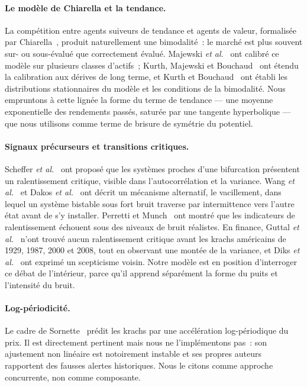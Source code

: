 \documentclass[11pt,a4paper]{article}
\begin{document}
\paragraph{Le modèle de Chiarella et la tendance.} La compétition entre agents suiveurs de tendance et agents de valeur, formalisée par Chiarella~\cite{chiarella1992}, produit naturellement une bimodalité~: le marché est plus souvent sur- ou sous-évalué que correctement évalué. Majewski \emph{et al.}~\cite{majewski2020} ont calibré ce modèle sur plusieurs classes d'actifs~; Kurth, Majewski et Bouchaud~\cite{kurth2025excess} ont étendu la calibration aux dérives de long terme, et Kurth et Bouchaud~\cite{kurth2025chiarella} ont établi les distributions stationnaires du modèle et les conditions de la bimodalité. Nous empruntons à cette lignée la forme du terme de tendance --- une moyenne exponentielle des rendements passés, saturée par une tangente hyperbolique --- que nous utilisons comme terme de brisure de symétrie du potentiel.

\paragraph{Signaux précurseurs et transitions critiques.} Scheffer \emph{et al.}~\cite{scheffer2009} ont proposé que les systèmes proches d'une bifurcation présentent un ralentissement critique, visible dans l'autocorrélation et la variance. Wang \emph{et al.}~\cite{wang2012} et Dakos \emph{et al.}~\cite{dakos2013} ont décrit un mécanisme alternatif, le vacillement, dans lequel un système bistable sous fort bruit traverse par intermittence vers l'autre état avant de s'y installer. Perretti et Munch~\cite{perretti2012} ont montré que les indicateurs de ralentissement échouent sous des niveaux de bruit réalistes. En finance, Guttal \emph{et al.}~\cite{guttal2016} n'ont trouvé aucun ralentissement critique avant les krachs américains de 1929, 1987, 2000 et 2008, tout en observant une montée de la variance, et Diks \emph{et al.}~\cite{diks2019} ont exprimé un scepticisme voisin. Notre modèle est en position d'interroger ce débat de l'intérieur, parce qu'il apprend séparément la forme du puits et l'intensité du bruit.

\paragraph{Log-périodicité.} Le cadre de Sornette~\cite{sornette2003,johansen1999} prédit les krachs par une accélération log-périodique du prix. Il est directement pertinent mais nous ne l'implémentons pas~: son ajustement non linéaire est notoirement instable et ses propres auteurs rapportent des fausses alertes historiques. Nous le citons comme approche concurrente, non comme composante.
\end{document}
